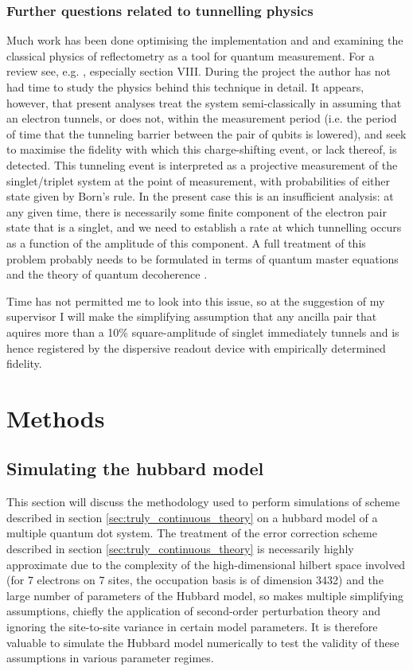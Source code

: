 \documentclass{report}
\begin{document}
\subsection{Further questions related to tunnelling physics} \label{sec:tunneling_question}

Much work has been done optimising the implementation and and examining the classical physics of reflectometry as a tool for quantum measurement. For a review see, e.g. \cite{Vigneau2023}, especially section VIII. During the project the author has not had time to study the physics behind this technique in detail. It appears, however, that present analyses treat the system semi-classically in assuming that an electron tunnels, or does not, within the measurement period (i.e. the period of time that the tunneling barrier between the pair of qubits is lowered), and seek to maximise the fidelity with which this charge-shifting event, or lack thereof, is detected. This tunneling event is interpreted as a projective measurement of the singlet/triplet system at the point of measurement, with probabilities of either state given by Born's rule. In the present case this is an insufficient analysis: at any given time, there is necessarily some finite component of the electron pair state that is a singlet, and we need to establish a rate at which tunnelling occurs as a function of the amplitude of this component. A full treatment of this problem probably needs to be formulated in terms of quantum master equations and the theory of quantum decoherence \cite{Wiseman1996}.

Time has not permitted me to look into this issue, so at the suggestion of my supervisor I will make the simplifying assumption that any ancilla pair that aquires more than a 10\% square-amplitude of singlet immediately tunnels and is hence registered by the dispersive readout device with empirically determined fidelity.

\chapter{Methods} \label{chap:methods}

\section{Simulating the hubbard model}
This section will discuss the methodology used to perform simulations of scheme described in section \ref{sec:truly_continuous_theory} on a hubbard model of a multiple quantum dot system. The treatment of the error correction scheme described in section \ref{sec:truly_continuous_theory} is necessarily highly approximate due to the complexity of the high-dimensional hilbert space involved (for 7 electrons on 7 sites, the occupation basis is of dimension 3432) and the large number of parameters of the Hubbard model, so makes multiple simplifying assumptions, chiefly the application of second-order perturbation theory and ignoring the site-to-site variance in certain model parameters. It is therefore valuable to simulate the Hubbard model numerically to test the validity of these assumptions in various parameter regimes.
\end{document}

